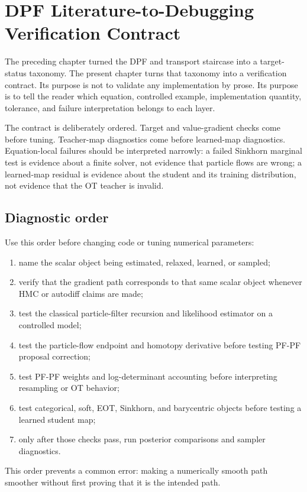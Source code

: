 \chapter{DPF Literature-to-Debugging Verification Contract}
\label{ch:bf-dpf-debug-crosswalk}

The preceding chapter turned the DPF and transport staircase into a target-status
taxonomy.  The present chapter turns that taxonomy into a verification
contract.  Its purpose is not to validate any implementation by prose.  Its
purpose is to tell the reader which equation, controlled example,
implementation quantity, tolerance, and failure interpretation belongs to each
layer.

The contract is deliberately ordered.  Target and value-gradient checks come
before tuning.  Teacher-map diagnostics come before learned-map diagnostics.
Equation-local failures should be interpreted narrowly: a failed Sinkhorn
marginal test is evidence about a finite solver, not evidence that particle
flows are wrong; a learned-map residual is evidence about the student and its
training distribution, not evidence that the OT teacher is invalid.

\section{Diagnostic order}
\label{sec:bf-dpf-debug-order}

Use this order before changing code or tuning numerical parameters:
\begin{enumerate}[label=(\arabic*)]
  \item name the scalar object being estimated, relaxed, learned, or sampled;
  \item verify that the gradient path corresponds to that same scalar object
    whenever HMC or autodiff claims are made;
  \item test the classical particle-filter recursion and likelihood estimator
    on a controlled model;
  \item test the particle-flow endpoint and homotopy derivative before testing
    PF-PF proposal correction;
  \item test PF-PF weights and log-determinant accounting before interpreting
    resampling or OT behavior;
  \item test categorical, soft, EOT, Sinkhorn, and barycentric objects before
    testing a learned student map;
  \item only after those checks pass, run posterior comparisons and sampler
    diagnostics.
\end{enumerate}
This order prevents a common error: making a numerically smooth path smoother
without first proving that it is the intended path.

